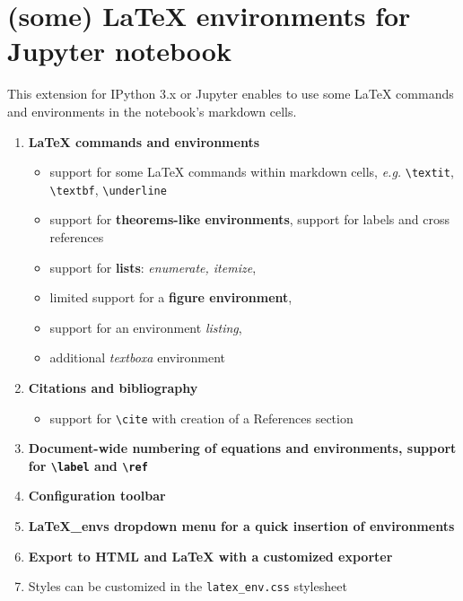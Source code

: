 
    
    
    
    


    

    
    \section{(some) LaTeX environments for Jupyter
notebook}\label{some-latex-environments-for-jupyter-notebook}

    This extension for IPython 3.x or Jupyter enables to use some LaTeX
commands and environments in the notebook's markdown cells.
\begin{enumerate} \item \textbf{LaTeX commands and environments}
\begin{itemize} \item support for some LaTeX commands within
markdown cells, \emph{e.g.} \texttt{\textbackslash{}textit},
\texttt{\textbackslash{}textbf}, \texttt{\textbackslash{}underline}
\item support for \textbf{theorems-like environments}, support for
labels and cross references \item support for \textbf{lists}:
\emph{enumerate, itemize},\\
\item limited support for a \textbf{figure environment}, \item support
for an environment \emph{listing}, \item additional \emph{textboxa}
environment \end{itemize} \item \textbf{Citations and
bibliography} \begin{itemize} \item support for
\texttt{\textbackslash{}cite} with creation of a References section
\end{itemize} \item \textbf{Document-wide numbering of
equations and environments, support for \texttt{\textbackslash{}label}
and \texttt{\textbackslash{}ref}} \item \textbf{Configuration toolbar}
\item \textbf{LaTeX\_envs dropdown menu for a quick insertion of
environments} \item \textbf{Export to HTML and LaTeX with a customized
exporter} \item Styles can be customized in the \texttt{latex\_env.css}
stylesheet \end{enumerate}

